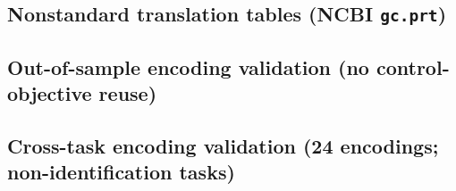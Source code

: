 \subsection{Nonstandard translation tables (NCBI \texttt{gc.prt})}
\label{app:nonstandard_codes}

\noindent
\medskip
\noindent

\subsection{Out-of-sample encoding validation (no control-objective reuse)}
\label{app:out_of_sample_validation}

\noindent

\noindent

\subsection{Cross-task encoding validation (24 encodings; non-identification tasks)}
\label{app:cross_task_validation}
\noindent
\noindent

\begin{center}
\scriptsize
\setlength{\tabcolsep}{3pt}
\renewcommand{\arraystretch}{1.10}
\end{center}

\medskip
\noindent

\begin{center}
\scriptsize
\setlength{\tabcolsep}{3pt}
\renewcommand{\arraystretch}{1.10}
\end{center}

